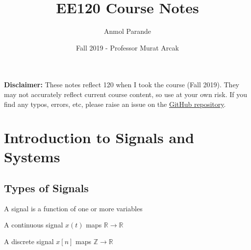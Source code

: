 

\title{EE120 Course Notes}
\author{Anmol Parande}
\date{Fall 2019 - Professor Murat Arcak}
\maketitle
\textbf{Disclaimer: }These notes reflect 120 when I took the course (Fall 2019). They may not accurately reflect current course content, so use at your own risk.
If you find any typos, errors, etc, please raise an issue on the \href{https://github.com/parandea17/BerkeleyNotes}{GitHub repository}.
\tableofcontents
\newpage
\section{Introduction to Signals and Systems}
\subsection{Types of Signals}
\begin{definition}
    A signal is a function of one or more variables
\end{definition}
\begin{definition}
    A continuous signal $x(t)$ maps $\mathbb{R} \rightarrow \mathbb{R}$
\end{definition}
\begin{definition}
    A discrete signal $x[n]$ maps $\mathbb{Z} \rightarrow \mathbb{R}$
\end{definition}
